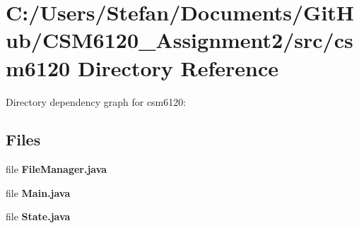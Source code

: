 \section{C\+:/\+Users/\+Stefan/\+Documents/\+Git\+Hub/\+C\+S\+M6120\+\_\+\+Assignment2/src/csm6120 Directory Reference}
\label{dir_c3b56f187ce6c57130618dc9b84636dd}
Directory dependency graph for csm6120\+:
\subsection*{Files}
\begin{DoxyCompactItemize}
\item 
file {\bfseries File\+Manager.\+java}
\item 
file {\bfseries Main.\+java}
\item 
file {\bfseries State.\+java}
\end{DoxyCompactItemize}
